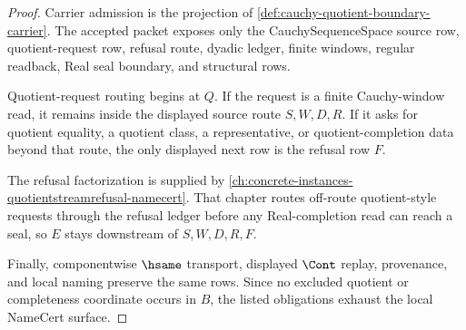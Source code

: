 \begin{proof}
Carrier admission is the projection of \autoref{def:cauchy-quotient-boundary-carrier}. The accepted packet exposes only the CauchySequenceSpace source row, quotient-request row, refusal route, dyadic ledger, finite windows, regular readback, Real seal boundary, and structural rows.

Quotient-request routing begins at $Q$. If the request is a finite Cauchy-window read, it remains inside the displayed source route $S,W,D,R$. If it asks for quotient equality, a quotient class, a representative, or quotient-completion data beyond that route, the only displayed next row is the refusal row $F$.

The refusal factorization is supplied by \autoref{ch:concrete-instances-quotientstreamrefusal-namecert}. That chapter routes off-route quotient-style requests through the refusal ledger before any Real-completion read can reach a seal, so $E$ stays downstream of $S,W,D,R,F$.

Finally, componentwise $\hsame$ transport, displayed $\Cont$ replay, provenance, and local naming preserve the same rows. Since no excluded quotient or completeness coordinate occurs in $B$, the listed obligations exhaust the local NameCert surface.
\end{proof}

